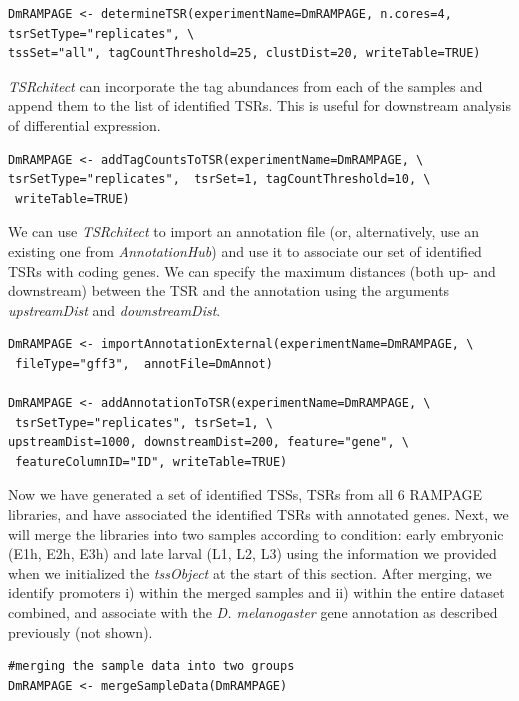 \documentclass[runningheads,a4paper]{llncs}
\begin{document}
\begin{linenumbers}
\noindent
\begin{verbatim}
DmRAMPAGE <- determineTSR(experimentName=DmRAMPAGE, n.cores=4, tsrSetType="replicates", \
tssSet="all", tagCountThreshold=25, clustDist=20, writeTable=TRUE)
\end{verbatim}

\textit{TSRchitect} can incorporate the tag abundances from each of the samples and append them to the list of identified TSRs. 
This is useful for downstream analysis of differential expression.

\noindent
\begin{verbatim}
DmRAMPAGE <- addTagCountsToTSR(experimentName=DmRAMPAGE, \
tsrSetType="replicates",  tsrSet=1, tagCountThreshold=10, \
 writeTable=TRUE)
\end{verbatim}

We can use \textit{TSRchitect} to import an annotation file (or, alternatively, use an existing one from \textit{AnnotationHub}) and use it to associate our set of identified TSRs with coding genes. 
We can specify the maximum distances (both up- and downstream) between the TSR and the annotation using the arguments \textit{upstreamDist} and \textit{downstreamDist}.

\noindent
\begin{verbatim}
DmRAMPAGE <- importAnnotationExternal(experimentName=DmRAMPAGE, \
 fileType="gff3",  annotFile=DmAnnot)

DmRAMPAGE <- addAnnotationToTSR(experimentName=DmRAMPAGE, \
 tsrSetType="replicates", tsrSet=1, \
upstreamDist=1000, downstreamDist=200, feature="gene", \
 featureColumnID="ID", writeTable=TRUE)
\end{verbatim}

Now we have generated a set of identified TSSs, TSRs from all 6 RAMPAGE libraries, and have associated the identified TSRs with annotated genes. 
Next, we will merge the libraries into two samples according to condition: early embryonic (E1h, E2h, E3h) and late larval (L1, L2, L3) using the information we provided when we initialized the \textit{tssObject} at the start of this section.
After merging, we identify promoters i) within the merged samples and ii) within the entire dataset combined, and associate with the \textit{D. melanogaster} gene annotation as described previously (not shown).

\noindent
\begin{verbatim}
#merging the sample data into two groups
DmRAMPAGE <- mergeSampleData(DmRAMPAGE)


\end{verbatim}
\end{linenumbers}
\end{document}
